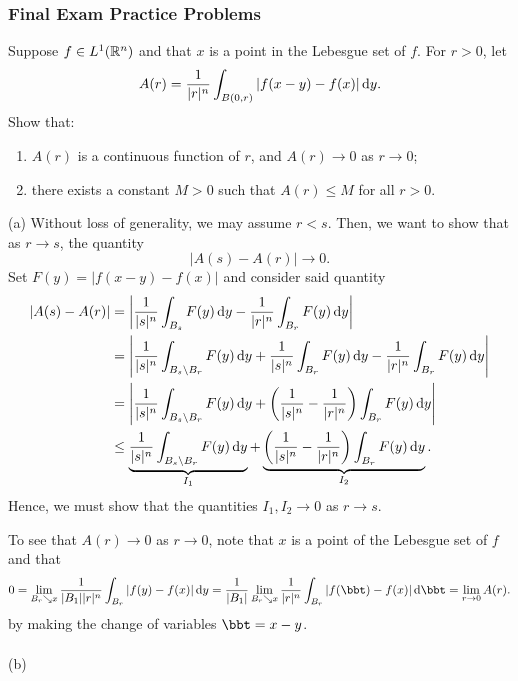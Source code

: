 \subsubsection{Final Exam Practice Problems}
\setcounter{exercise}{0}
\setcounter{equation}{0}

\begin{problem}
Suppose $f\in L^1(\mathbb{R}^n)$ and that $x$ is a point in the Lebesgue set of
$f$. For $r>0$, let
\[
A(r)=\frac{1}{|r|^n}\int_{B(0,r)}|f( x - y )-f( x )|\mathop{}\!\mathrm{d} y .
\]
Show that:
\begin{enumerate}[label=(\alph*),noitemsep]
\item $A(r)$ is a continuous function of $r$, and $A(r)\to 0$ as $r\to 0$;
\item there exists a constant $M>0$ such that $A(r)\leq M$ for all $r>0$.
\end{enumerate}
\end{problem}
\begin{solution}
(a) Without loss of generality, we may assume $r<s$. Then, we want to show
that as $r\to s$, the quantity
\[
|A(s)-A(r)|\longrightarrow 0.
\]
Set $F( y )= |f( x - y )-f( x )|$ and consider said quantity
\begin{align*}
|A(s)-A(r)|
&=\left|
\frac{1}{|s|^n}\int_{B_s}F( y )\diff y
-
\frac{1}{|r|^n}\int_{B_r}F( y )\diff y
\right|\\
&=\left|
\frac{1}{|s|^n}\int_{B_s\setminus B_r}F( y )\diff y +
\frac{1}{|s|^n}\int_{B_r}F( y )\diff y -
\frac{1}{|r|^n}\int_{B_r}F( y )\diff y
\right|\\
&=\left|
\frac{1}{|s|^n}\int_{B_s\setminus B_r}F( y )\diff y
+\left(\frac{1}{|s|^n}-\frac{1}{|r|^n}\right)\int_{B_r}F( y )\diff y
\right|\\
&\leq
\underbrace{\frac{1}{|s|^n}\int_{B_s\setminus B_r}F( y )\diff y }_{I_1}
+\underbrace{\left(\frac{1}{|s|^n}-\frac{1}{|r|^n}\right)\int_{B_r}F( y )\diff y }_{I_2}.
\end{align*}
Hence, we must show that the quantities $I_1,I_2\to 0$ as $r\to s$.

To see that $A(r)\to 0$ as $r\to 0$, note that $x$ is a point of the
Lebesgue set of $f$ and that
\[
0=\lim_{B_r\searrow x }\frac{1}{|B_1||r|^n}\int_{B_r}|f( y )-f( x )|\diff y =\frac{1}{|B_1|}\lim_{B_r\searrow x }\frac{1}{|r|^n}\int_{B_r}|f(\bbt)-f( x )|\diff\bbt=\lim_{r\to
0}A(r).
\]
by making the change of variables $\bbt= x - y $.
\\\\
(b)
\end{solution}

